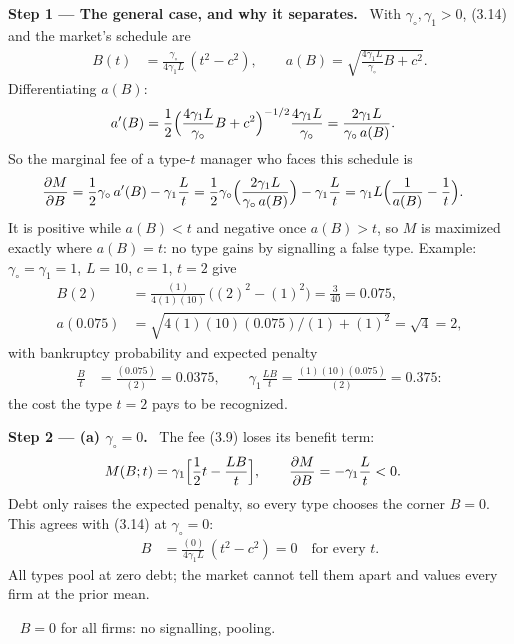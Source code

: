 \documentclass[11pt,a4paper]{article}
\newcommand{\step}[2]{\par\medskip\noindent\textbf{Step #1 --- #2.}~}
\newcommand{\answer}[1]{\par\smallskip\noindent\fbox{\textbf{Answer #1.}}~}
\begin{document}
\step{1}{The general case, and why it separates} With $\gamma_\circ,\gamma_1>0$, (3.14) and the market's schedule are
\begin{align}
  B(t) &= \frac{\gamma_\circ}{4\gamma_1 L}\,(t^2-c^2), \qquad a(B) = \sqrt{\frac{4\gamma_1 L}{\gamma_\circ}B + c^2}. \label{r5e8-B}
\end{align}
Differentiating $a(B)$:
\begin{align}
  a'(B) &= \frac12\Bigl(\frac{4\gamma_1 L}{\gamma_\circ}B + c^2\Bigr)^{-1/2}\frac{4\gamma_1 L}{\gamma_\circ} = \frac{2\gamma_1 L}{\gamma_\circ\,a(B)}. \nonumber
\end{align}
So the marginal fee of a type-$t$ manager who faces this schedule is
\begin{align}
  \frac{\partial M}{\partial B} &= \frac12\gamma_\circ\,a'(B) - \gamma_1\frac{L}{t}
   = \frac12\gamma_\circ\Bigl(\frac{2\gamma_1 L}{\gamma_\circ\,a(B)}\Bigr) - \gamma_1\frac{L}{t}
   = \gamma_1 L\Bigl(\frac{1}{a(B)} - \frac1t\Bigr). \label{r5e8-dM}
\end{align}
It is positive while $a(B)<t$ and negative once $a(B)>t$, so $M$ is maximized exactly where $a(B)=t$: no type gains by signalling a false type. Example: $\gamma_\circ=\gamma_1=1$, $L=10$, $c=1$, $t=2$ give
\begin{align}
  B(2) &= \frac{(1)}{4(1)(10)}\,\bigl((2)^2-(1)^2\bigr) = \frac{3}{40} = 0.075, \nonumber\\
  a(0.075) &= \sqrt{4(1)(10)(0.075)/(1) + (1)^2} = \sqrt{4} = 2, \nonumber
\end{align}
with bankruptcy probability and expected penalty
\begin{align}
  \frac{B}{t} &= \frac{(0.075)}{(2)} = 0.0375, \qquad \gamma_1\frac{LB}{t} = \frac{(1)(10)(0.075)}{(2)} = 0.375: \nonumber
\end{align}
the cost the type $t=2$ pays to be recognized.

\step{2}{(a) $\gamma_\circ=0$} The fee (3.9) loses its benefit term:
\begin{align}
  M(B;t) &= \gamma_1\Bigl[\frac12 t - \frac{LB}{t}\Bigr], \qquad \frac{\partial M}{\partial B} = -\gamma_1\frac{L}{t} < 0. \nonumber
\end{align}
Debt only raises the expected penalty, so every type chooses the corner $B=0$. This agrees with (3.14) at $\gamma_\circ=0$:
\begin{align}
  B &= \frac{(0)}{4\gamma_1 L}\,(t^2-c^2) = 0 \quad\text{for every } t. \nonumber
\end{align}
All types pool at zero debt; the market cannot tell them apart and values every firm at the prior mean.
\answer{(a)} $B=0$ for all firms: no signalling, pooling.
\end{document}
